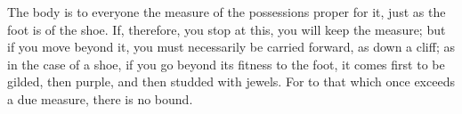The body is to everyone the measure of the possessions proper
for it, just as the foot is of the shoe. If, therefore, you stop at
this, you will keep the measure; but if you move beyond it, you must
necessarily be carried forward, as down a cliff; as in the case of
a shoe, if you go beyond its fitness to the foot, it comes first to
be gilded, then purple, and then studded with jewels. For to that
which once exceeds a due measure, there is no bound. 
